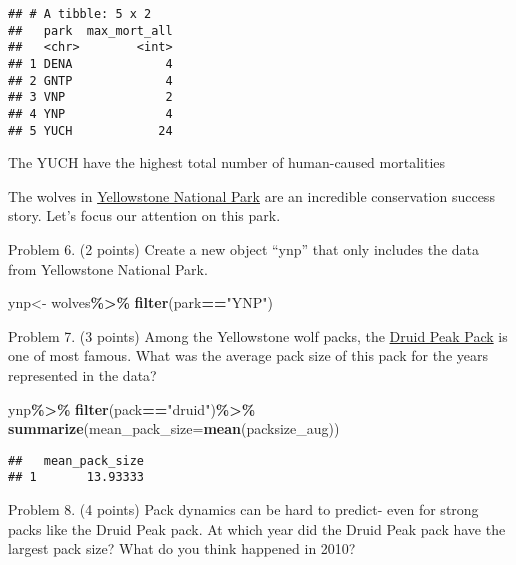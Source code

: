 \documentclass[
]{article}
\newenvironment{Shaded}{\begin{snugshade}}{\end{snugshade}}
\newcommand{\AttributeTok}[1]{\textcolor[rgb]{0.13,0.29,0.53}{#1}}
\newcommand{\FunctionTok}[1]{\textcolor[rgb]{0.13,0.29,0.53}{\textbf{#1}}}
\newcommand{\NormalTok}[1]{#1}
\newcommand{\OtherTok}[1]{\textcolor[rgb]{0.56,0.35,0.01}{#1}}
\newcommand{\SpecialCharTok}[1]{\textcolor[rgb]{0.81,0.36,0.00}{\textbf{#1}}}
\newcommand{\StringTok}[1]{\textcolor[rgb]{0.31,0.60,0.02}{#1}}
\begin{document}
\begin{verbatim}
## # A tibble: 5 x 2
##   park  max_mort_all
##   <chr>        <int>
## 1 DENA             4
## 2 GNTP             4
## 3 VNP              2
## 4 YNP              4
## 5 YUCH            24
\end{verbatim}

The YUCH have the highest total number of human-caused mortalities

The wolves in
\href{https://www.nps.gov/yell/learn/nature/wolf-restoration.htm}{Yellowstone
National Park} are an incredible conservation success story. Let's focus
our attention on this park.

Problem 6. (2 points) Create a new object ``ynp'' that only includes the
data from Yellowstone National Park.

\begin{Shaded}
\begin{Highlighting}[]
\NormalTok{ynp}\OtherTok{\textless{}{-}}\NormalTok{ wolves}\SpecialCharTok{\%\textgreater{}\%}
    \FunctionTok{filter}\NormalTok{(park}\SpecialCharTok{==}\StringTok{"YNP"}\NormalTok{)}
\end{Highlighting}
\end{Shaded}

Problem 7. (3 points) Among the Yellowstone wolf packs, the
\href{https://www.pbs.org/wnet/nature/in-the-valley-of-the-wolves-the-druid-wolf-pack-story/209/}{Druid
Peak Pack} is one of most famous. What was the average pack size of this
pack for the years represented in the data?

\begin{Shaded}
\begin{Highlighting}[]
\NormalTok{ynp}\SpecialCharTok{\%\textgreater{}\%}
  \FunctionTok{filter}\NormalTok{(pack}\SpecialCharTok{==}\StringTok{"druid"}\NormalTok{)}\SpecialCharTok{\%\textgreater{}\%}
  \FunctionTok{summarize}\NormalTok{(}\AttributeTok{mean\_pack\_size=}\FunctionTok{mean}\NormalTok{(packsize\_aug))}
\end{Highlighting}
\end{Shaded}

\begin{verbatim}
##   mean_pack_size
## 1       13.93333
\end{verbatim}

Problem 8. (4 points) Pack dynamics can be hard to predict- even for
strong packs like the Druid Peak pack. At which year did the Druid Peak
pack have the largest pack size? What do you think happened in 2010?
\end{document}
